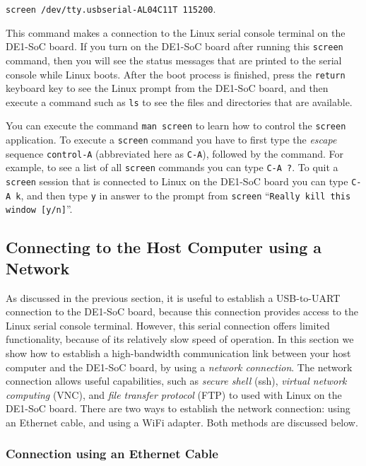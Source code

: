 \documentclass[11pt, twoside, pdftex]{article}
\begin{document}
\texttt{screen /dev/tty.usbserial-AL04C11T 115200}.

This command makes a connection to the Linux serial console terminal on the DE1-SoC board. 
If you turn on the DE1-SoC board after running this \texttt{screen} command, then you will
see the status messages that are printed to the serial console while Linux boots. After
the boot process is finished, press the \texttt{return} keyboard key to see the Linux
prompt from the DE1-SoC board, and then execute a command such as \texttt{ls} to see 
the files and directories that are available.

You can execute the command \texttt{man screen} to learn how to control the
\texttt{screen} application. To execute a \texttt{screen} command you have to first type
the {\it escape} sequence \texttt{control-A} (abbreviated here as \texttt{C-A}), 
followed by the command. For example, to see a list of all \texttt{screen} commands you can 
type \texttt{C-A ?}. To quit a \texttt{screen} session that is connected to Linux on the
DE1-SoC board you can type \texttt{C-A k}, and then type \texttt{y} in answer to the
prompt from \texttt{screen} ``\texttt{Really kill this window [y/n]}''.

\subsection{Connecting to the Host Computer using a Network}
\label{sec:conn_network}

As discussed in the previous section, it is useful to establish a USB-to-UART connection 
to the DE1-SoC board, because this connection provides access to the Linux serial console 
terminal.  However, this serial connection offers limited functionality, because of its 
relatively slow speed of operation. In this section we show how to establish a high-bandwidth 
communication link between your host computer and the DE1-SoC board, by using a 
{\it network connection}. The network connection allows useful capabilities, such as 
{\it secure shell} (ssh), {\it virtual network computing} (VNC), and {\it file transfer
protocol} (FTP) to used with Linux on the DE1-SoC board. There are two ways to establish 
the network connection: using an Ethernet cable, and using a WiFi adapter. 
Both methods are discussed below.

\subsubsection{Connection using an Ethernet Cable}
\end{document}
